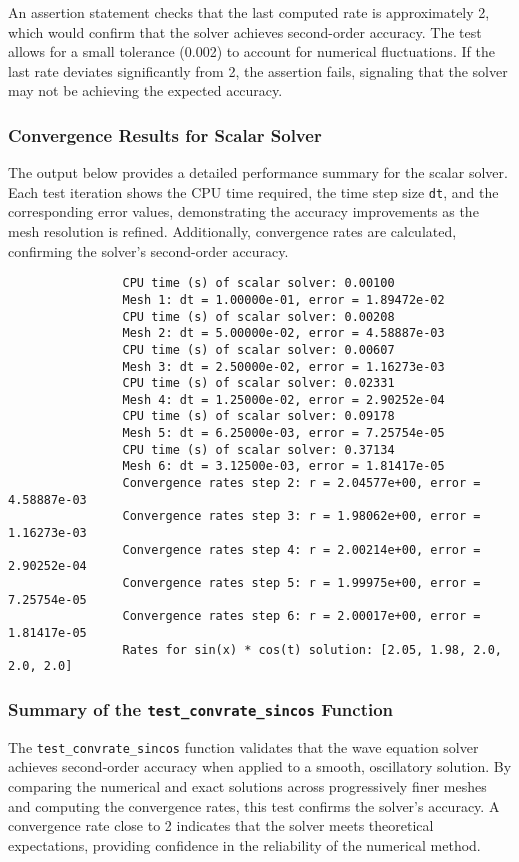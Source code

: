 \documentclass{article}
\begin{document}
			An assertion statement checks that the last computed rate is approximately 2, which would confirm that the solver achieves second-order accuracy. The test allows for a small tolerance (0.002) to account for numerical fluctuations. If the last rate deviates significantly from 2, the assertion fails, signaling that the solver may not be achieving the expected accuracy.
			
			\subsubsection{Convergence Results for Scalar Solver}
			
			The output below provides a detailed performance summary for the scalar solver. Each test iteration shows the CPU time required, the time step size \texttt{dt}, and the corresponding error values, demonstrating the accuracy improvements as the mesh resolution is refined. Additionally, convergence rates are calculated, confirming the solver's second-order accuracy.
			
			\begin{verbatim}
				CPU time (s) of scalar solver: 0.00100
				Mesh 1: dt = 1.00000e-01, error = 1.89472e-02
				CPU time (s) of scalar solver: 0.00208       
				Mesh 2: dt = 5.00000e-02, error = 4.58887e-03
				CPU time (s) of scalar solver: 0.00607       
				Mesh 3: dt = 2.50000e-02, error = 1.16273e-03
				CPU time (s) of scalar solver: 0.02331
				Mesh 4: dt = 1.25000e-02, error = 2.90252e-04
				CPU time (s) of scalar solver: 0.09178
				Mesh 5: dt = 6.25000e-03, error = 7.25754e-05
				CPU time (s) of scalar solver: 0.37134
				Mesh 6: dt = 3.12500e-03, error = 1.81417e-05
				Convergence rates step 2: r = 2.04577e+00, error = 4.58887e-03
				Convergence rates step 3: r = 1.98062e+00, error = 1.16273e-03
				Convergence rates step 4: r = 2.00214e+00, error = 2.90252e-04
				Convergence rates step 5: r = 1.99975e+00, error = 7.25754e-05
				Convergence rates step 6: r = 2.00017e+00, error = 1.81417e-05
				Rates for sin(x) * cos(t) solution: [2.05, 1.98, 2.0, 2.0, 2.0]
			\end{verbatim}
			
			\subsubsection{Summary of the \texttt{test\_convrate\_sincos} Function}
			
			The \texttt{test\_convrate\_sincos} function validates that the wave equation solver achieves second-order accuracy when applied to a smooth, oscillatory solution. By comparing the numerical and exact solutions across progressively finer meshes and computing the convergence rates, this test confirms the solver’s accuracy. A convergence rate close to 2 indicates that the solver meets theoretical expectations, providing confidence in the reliability of the numerical method.
			
\end{document}
